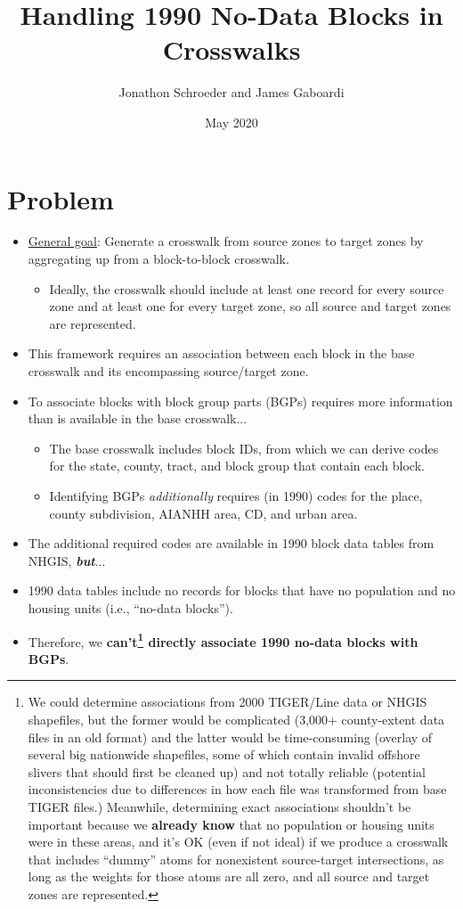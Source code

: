 \documentclass{article}
\title{Handling 1990 No-Data Blocks in Crosswalks}
\author{Jonathon Schroeder and James Gaboardi}
\date{May 2020}
\begin{document}
\maketitle



\section{Problem}
\begin{itemize}
  \item \href{https://github.com/jGaboardi/nhgisxwalk/blob/master/resources/general-crosswalk-construction-framework.pdf}{General goal}: Generate a crosswalk from source zones to target zones by aggregating up from a block-to-block crosswalk.
  \begin{itemize}
      \item Ideally, the crosswalk should include at least one record for every source zone and at least one for every target zone, so all source and target zones are represented.
  \end{itemize}
  \item This framework requires an association between each block in the base crosswalk and its encompassing source/target zone.
  \item To associate blocks with block group parts (BGPs) requires more information than is available in the base crosswalk...
  \begin{itemize}
      \item The base crosswalk includes block IDs, from which we can derive codes for the state, county, tract, and block group that contain each block.
      \item Identifying BGPs \textit{additionally} requires (in 1990) codes for the place, county subdivision, AIANHH area, CD, and urban area.
  \end{itemize}
  \item The additional required codes are available in 1990 block data tables from NHGIS, \textbf{\textit{but}}...
  \item 1990 data tables include no records for blocks that have no population and no housing units (i.e., ``no-data blocks'').
  \item Therefore, we \textbf{can't\footnote{We could determine associations from 2000 TIGER/Line data or NHGIS shapefiles, but the former would be complicated (3,000+ county-extent data files in an old format) and the latter would be time-consuming (overlay of several big nationwide shapefiles, some of which contain invalid offshore slivers that should first be cleaned up) and not totally reliable (potential inconsistencies due to differences in how each file was transformed from base TIGER files.) Meanwhile, determining exact associations shouldn't be important because we \textbf{already know} that no population or housing units were in these areas, and it's OK (even if not ideal) if we produce a crosswalk that includes ``dummy'' atoms for nonexistent source-target intersections, as long as the weights for those atoms are all zero, and all source and target zones are represented.} directly associate 1990 no-data blocks with BGPs}.
\end{itemize}
\end{document}
